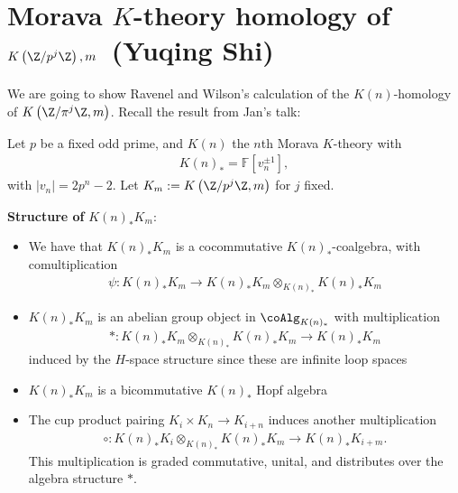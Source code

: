 \renewcommand{\thespeaker}{Yuqing Shi}
\renewcommand{\thetitle}{Morava $K$-theory homology of $K \left(\Z/p^j \Z \right),m$}
\section{\thetitle~(\thespeaker)}
\providecommand{\Supp}{\text{Supp}}
\providecommand{\HopfAlg}{\texttt{HopfAlg}}
\let\sqtimes\boxtimes
\providecommand{\DM}{\text{DM}}
\providecommand{\Spf}{\texttt{Spf}}

We are going to show Ravenel and Wilson's calculation of the $K(n)$-homology of $K \left( \Z/\pi^j \Z, m \right)$. Recall the result from Jan's talk:

\begin{notation} Let $p$ be a fixed odd prime, and $K(n)$ the $n$th Morava $K$-theory with
\begin{align*}
    K(n)_\ast = \mathbb{F} \left[ v_n^{\pm 1} \right],
\end{align*}
with $|v_n| = 2p^n-2$. Let $K_m := K \left( \Z/p^j \Z, m \right)$ for $j$ fixed.
\end{notation}

\textbf{Structure of} $K(n)_\ast K_m$:
\begin{itemize}
    \item We have that $K(n)_\ast K_m$ is a cocommutative $K(n)_\ast$-coalgebra, with comultiplication
    \begin{align*}
        \psi : K(n)_\ast K_m \to K(n)_\ast K_m \otimes_{K(n)_\ast} K(n)_\ast K_m
    \end{align*}
    \item $K(n)_\ast K_m$ is an abelian group object in $\coAlg_{K(n)_\ast}$ with multiplication
    \begin{align*}
        \ast : K(n)_\ast K_m \otimes_{K(n)_\ast} K(n)_\ast K_m \to K(n)_\ast K_m
    \end{align*}
    induced by the $H$-space structure since these are infinite loop spaces
    \item $K(n)_\ast K_m$ is a bicommutative $K(n)_\ast$ Hopf algebra

    \item The cup product pairing $K_i \times K_n \to K_{i+n}$ induces another multiplication
    \begin{align*}
        \circ : K(n)_\ast K_i \otimes_{K(n)_\ast} K(n)_\ast K_m \to K(n)_\ast K_{i+m}.
    \end{align*}
    This multiplication is graded commutative, unital, and distributes over the algebra structure $\ast$.
\end{itemize}

